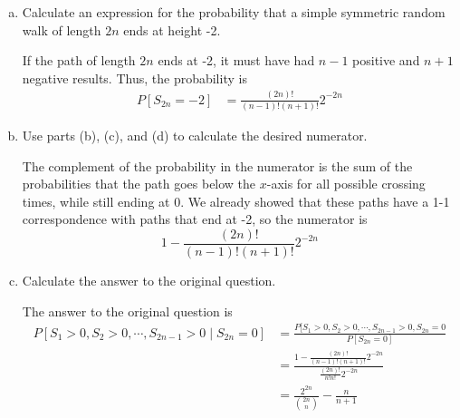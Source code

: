 \documentclass{article}
\begin{document}
\begin{enumerate}[(1)]
\begin{enumerate}[(a)]
			\item Calculate an expression for the probability that a simple symmetric random walk of length $2n$ ends at height -2.
				\begin{soln}
					If the path of length $2n$ ends at -2, it must have had $n-1$ positive and $n+1$ negative results. Thus, the probability is
					\begin{align*}
						P[S_{2n}=-2] &= \frac{(2n)!}{(n-1)!(n+1)!}2^{-2n}
					\end{align*}
				\end{soln}

			\item Use parts (b), (c), and (d) to calculate the desired numerator.
				\begin{soln}
					The complement of the probability in the numerator is the sum of the probabilities that the path goes below the $x$-axis for all possible crossing times, while still ending at 0. We already showed that these paths have a 1-1 correspondence with paths that end at -2, so the numerator is
					\[1-\frac{(2n)!}{(n-1)!(n+1)!}2^{-2n}\]
				\end{soln}

			\item Calculate the answer to the original question.
				\begin{soln}
					The answer to the original question is
					\begin{align*}
						P[S_1>0, S_2>0, \cdots, S_{2n-1}>0\mid S_{2n}=0] &= \frac{P[S_1>0, S_2>0, \cdots, S_{2n-1}>0, S_{2n}=0}{P[S_{2n}=0]} \\
							&= \frac{1-\frac{(2n)!}{(n-1)!(n+1)!}2^{-2n}}{\frac{(2n)!}{n!n!}2^{-2n}} \\
							&= \frac{2^{2n}}{\binom{2n}{n}}- \frac{n}{n+1}
					\end{align*}
				\end{soln}
				
		\end{enumerate}
		
\end{enumerate}
\end{document}

